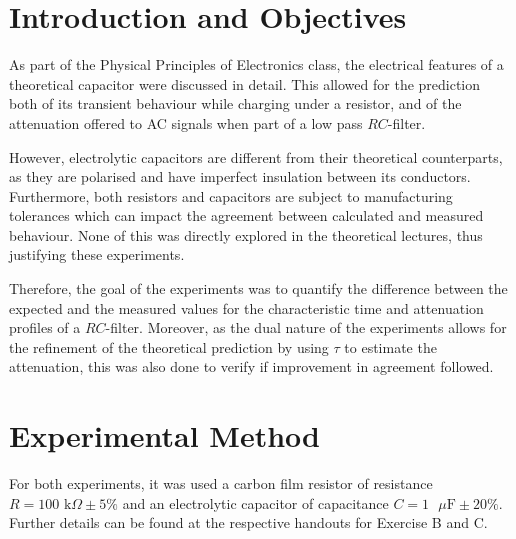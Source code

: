\documentclass{article}
\begin{document}
\newcommand{\Vout}{V_{\text{out}}}
\newcommand{\Vin}{V_{\text{in}}}
\newcommand{\Vusb}{V_{\text{USB}}}
\newcommand{\vout}{v_{\text{out}}}
\newcommand{\Vmax}{V_{\text{max}}}
\newcommand{\vin}{v_{\text{in}}}
\newcommand{\vinr}{v_{\text{in}}^{\text{RMS}}}
\newcommand{\voutr}{v_{\text{out}}^{\text{RMS}}}
\newcommand{\td}{t_\text{d}}

\section{Introduction and Objectives}
As part of the Physical Principles of Electronics class, the electrical features of a theoretical capacitor were discussed in detail. This allowed for the prediction both of its transient behaviour while charging under a resistor, and of the attenuation offered to AC signals when part of a low pass $RC$-filter.
\par However, electrolytic capacitors are different from their theoretical counterparts, as they are polarised and have imperfect insulation between its conductors. Furthermore, both resistors and capacitors are subject to manufacturing tolerances which can impact the agreement between calculated and measured behaviour. None of this was directly explored in the theoretical lectures, thus justifying these experiments.
\par Therefore, the goal of the experiments was to quantify the difference between the expected and the measured values for the characteristic time and attenuation profiles of a $RC$-filter. Moreover, as the dual nature of the experiments allows for the refinement of the theoretical prediction by using $\tau$ to estimate the attenuation, this was also done to verify if improvement in agreement followed. 
\section{Experimental Method}
For both experiments, it was used a carbon film resistor of resistance $R = 100 \text{ k}\Omega \pm 5\%$ and an electrolytic capacitor of capacitance $C = 1 \text{ }\mu\text{F} \pm 20\%$. Further details can be found at the respective handouts for Exercise B and C.
\end{document}
